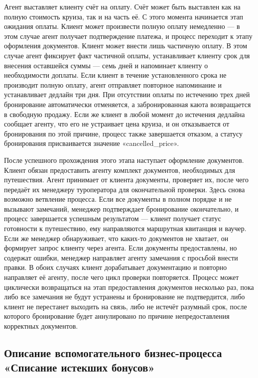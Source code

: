 \documentclass[11pt,a4paper,final]{article}
\begin{document}
Агент выставляет клиенту счёт на оплату. Счёт может быть выставлен как на полную стоимость круиза, так и на часть её. С этого момента начинается этап ожидания оплаты. Клиент может произвести полную оплату немедленно — в этом случае агент получает подтверждение платежа, и процесс переходит к этапу оформления документов. Клиент может внести лишь частичную оплату. В этом случае агент фиксирует факт частичной оплаты, устанавливает клиенту срок для внесения оставшейся суммы — семь дней и напоминает клиенту о необходимости доплаты. Если клиент в течение установленного срока не производит полную оплату, агент отправляет повторное напоминание и устанавливает дедлайн три дня. При отсутствии оплаты по истечению трех дней бронирование автоматически отменяется, а забронированная каюта возвращается в свободную продажу. Если же клиент в любой момент до истечения дедлайна сообщает агенту, что его не устраивает цена круиза, и он отказывается от бронирования по этой причине, процесс также завершается отказом, а статусу бронирования присваивается значение «cancelled\_price».

После успешного прохождения этого этапа наступает оформление документов. Клиент обязан предоставить агенту комплект документов, необходимых для путешествия. Агент принимает от клиента документы, проверяет их, после чего передаёт их менеджеру туроператора для окончательной проверки. Здесь снова возможно ветвление процесса. Если все документы в полном порядке и не вызывают замечаний, менеджер подтверждает бронирование окончательно, и процесс завершается успешным результатом — клиент получает статус готовности к путешествию, ему направляются маршрутная квитанция и ваучер. Если же менеджер обнаруживает, что каких-то документов не хватает, он формирует запрос клиенту через агента. Если документы предоставлены, но содержат ошибки, менеджер направляет агенту замечания с просьбой внести правки. В обоих случаях клиент дорабатывает документацию и повторно направляет её агенту, после чего цикл проверки повторяется. Процесс может циклически возвращаться на этап предоставления документов несколько раз, пока либо все замечания не будут устранены и бронирование не подтвердится, либо клиент не перестанет выходить на связь, либо не истечёт разумный срок, после которого бронирование будет аннулировано по причине непредоставления корректных документов.

	
	
\newpage
\subsection{Описание вспомогательного бизнес-процесса «Списание истекших бонусов»}
\end{document}
